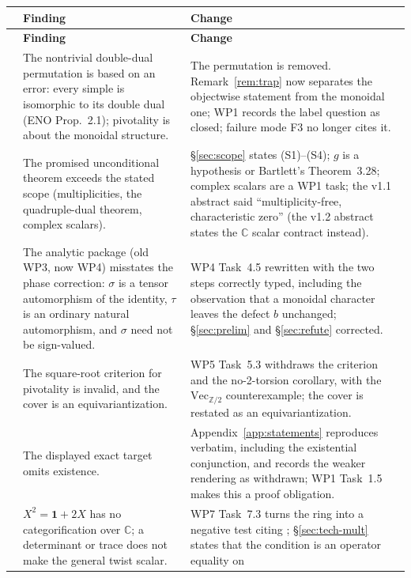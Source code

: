 \documentclass[11pt,a4paper]{article}
\theoremstyle{remark}
\newcommand{\code}[1]{\texttt{\detokenize{#1}}}
\newcommand{\Vect}{\mathrm{Vec}}
\newcommand{\one}{\mathbf{1}}
\newcommand{\Cx}{\mathbb{C}}
\newcommand{\Z}{\mathbb{Z}}
\begin{document}
\begin{center}
\small
\begin{longtable}{@{}>{\raggedright\arraybackslash}p{}>{\raggedright\arraybackslash}p{}>{\raggedright\arraybackslash}p{}@{}}
\toprule
& \textbf{Finding} & \textbf{Change} \\
\midrule
\endfirsthead
\toprule
& \textbf{Finding} & \textbf{Change} \\
\midrule
\endhead
\bottomrule
\endlastfoot
1 & The nontrivial double-dual permutation is based on an error: every simple is isomorphic to
its double dual (ENO Prop.~2.1); pivotality is about the monoidal structure. & The permutation is
removed. Remark~\ref{rem:trap} now separates the objectwise statement from the monoidal one;
WP1 records the label question as closed; failure mode F3 no longer cites it. \\
2 & The promised unconditional theorem exceeds the stated scope (multiplicities, the
quadruple-dual theorem, complex scalars). & \S\ref{sec:scope} states (S1)--(S4); $g$ is a
hypothesis or Bartlett's Theorem~3.28; complex scalars are a WP1 task; the v1.1 abstract said
``multiplicity-free, characteristic zero'' (the v1.2 abstract states the $\Cx$ scalar
contract instead). \\
3 & The analytic package (old WP3, now WP4) misstates the phase correction: $\sigma$ is a tensor
automorphism of the identity, $\tau$ is an ordinary natural automorphism, and $\sigma$ need not be
sign-valued. & WP4 Task~4.5 rewritten with the two steps correctly typed, including the observation that a monoidal character
leaves the defect $b$ unchanged; \S\ref{sec:prelim} and \S\ref{sec:refute} corrected. \\
4 & The square-root criterion for pivotality is invalid, and the cover is an equivariantization.
& WP5 Task~5.3 withdraws the criterion and the no-2-torsion corollary, with the
$\Vect_{\Z/2}$ counterexample; the cover is restated as an equivariantization. \\
5 & The displayed exact target omits existence. & Appendix~\ref{app:statements} reproduces
\code{ENO823Exact} verbatim, including the existential conjunction, and records the weaker
rendering as withdrawn; WP1 Task~1.5 makes this a proof obligation. \\
6 & $X^{2} = \one + 2X$ has no categorification over $\Cx$; a determinant or trace does not make
the general twist scalar. & WP7 Task~7.3 turns the ring into a negative test citing
\cite{OstrikRank2}; \S\ref{sec:tech-mult} states that the condition is an operator equality on

\end{longtable}
\end{center}
\end{document}
